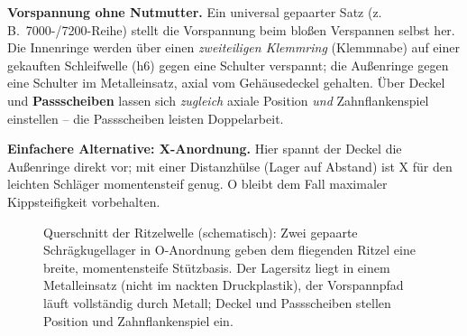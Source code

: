 \textbf{Vorspannung ohne Nutmutter.} Ein universal gepaarter Satz (z.\,B.\
7000-/7200-Reihe) stellt die Vorspannung beim blo\ss en Verspannen selbst her. Die
Innenringe werden \"uber einen \emph{zweiteiligen Klemmring} (Klemmnabe) auf einer
gekauften Schleifwelle (h6) gegen eine Schulter verspannt; die Au\ss enringe gegen
eine Schulter im Metalleinsatz, axial vom Geh\"ausedeckel gehalten. \"Uber Deckel
und \textbf{Passscheiben} lassen sich \emph{zugleich} axiale Position \emph{und}
Zahnflankenspiel einstellen -- die Passscheiben leisten Doppelarbeit.

\textbf{Einfachere Alternative: X-Anordnung.} Hier spannt der Deckel die
Au\ss enringe direkt vor; mit einer Distanzh\"ulse (Lager auf Abstand) ist X f\"ur
den leichten Schl\"ager momentensteif genug. O bleibt dem Fall maximaler
Kippsteifigkeit vorbehalten.

\begin{figure}[htbp]
\centering
{}
\caption{Querschnitt der Ritzelwelle (schematisch): Zwei gepaarte
Schr\"agkugellager in O-Anordnung geben dem fliegenden Ritzel eine breite,
momentensteife St\"utzbasis. Der Lagersitz liegt in einem Metalleinsatz (nicht im
nackten Druckplastik), der Vorspannpfad l\"auft vollst\"andig durch Metall; Deckel
und Passscheiben stellen Position und Zahnflankenspiel ein.}
\label{fig:ttr-arm-lager}
\end{figure}

